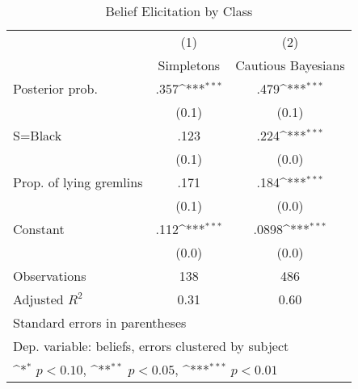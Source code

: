 \begin{table}[htbp]\centering
\def\sym#1{\ifmmode^{#1}\else\(^{#1}\)\fi}
\caption{Belief Elicitation by Class}
\begin{tabular}{l*{2}{c}}
\hline\hline
                &\multicolumn{1}{c}{(1)}&\multicolumn{1}{c}{(2)}\\
                &\multicolumn{1}{c}{Simpletons}&\multicolumn{1}{c}{Cautious Bayesians}\\
\hline
Posterior prob. &     .357\sym{***}&     .479\sym{***}\\
                &    (0.1)         &    (0.1)         \\
S=Black         &     .123         &     .224\sym{***}\\
                &    (0.1)         &    (0.0)         \\
Prop. of lying gremlins&     .171         &     .184\sym{***}\\
                &    (0.1)         &    (0.0)         \\
Constant        &     .112\sym{***}&    .0898\sym{***}\\
                &    (0.0)         &    (0.0)         \\
\hline
Observations    &      138         &      486         \\
Adjusted \(R^{2}\)&     0.31         &     0.60         \\
\hline\hline
\multicolumn{3}{l}{\footnotesize Standard errors in parentheses}\\
\multicolumn{3}{l}{\footnotesize Dep. variable: beliefs, errors clustered by subject}\\
\multicolumn{3}{l}{\footnotesize \sym{*} \(p<0.10\), \sym{**} \(p<0.05\), \sym{***} \(p<0.01\)}\\
\end{tabular}
\end{table}
